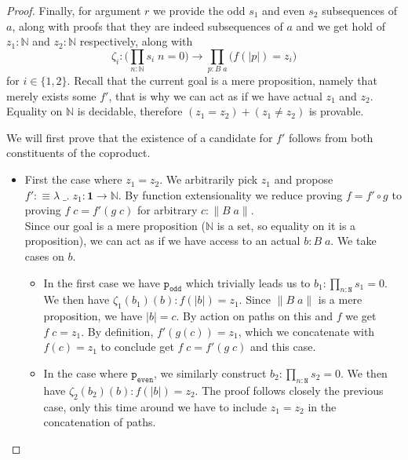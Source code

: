 \documentclass[12pt]{report}
\begin{document}
\begin{proof}
Finally, for argument $r$ we provide the odd $s_1$ and even $s_2$ subsequences of $a$, along with proofs that they are indeed subsequences of $a$ and we get hold of $z_1 : \mathbb{N}$ and $z_2 : \mathbb{N} $ respectively, along with 
$$\zeta_i : \big(\prod_{n : \mathbb{N}}s_i\; n = 0 \big)\rightarrow \prod_{p : B\; a}\big(f(|p|)=z_i\big)$$
for $i \in \{1,2\}$. 
Recall that the current goal is a mere proposition, namely that merely exists some $f'$, that is why we can act as if we have actual $z_1$ and $z_2$. 
Equality on $\mathbb{N}$ is decidable, therefore $(z_1 = z_2) + (z_1 \neq z_2)$ is provable. 

We will first prove that the existence of a candidate for $f'$ follows from both constituents of the coproduct.
\begin{itemize}
\item First the case where $z_1= z_2$. 
We arbitrarily pick $z_1$ and propose $f' : \equiv \lambda \;\_.\; z_1 : \mathbf{1} \rightarrow \mathbb{N}$. 
By function extensionality we reduce proving $f= f' \circ g$ to proving $f\; c = f'(g\; c)$ for arbitrary $c : \lVert B\; a\rVert$.\\
Since our goal is a mere proposition ($\mathbb{N}$ is a set, so equality on it is a proposition), we can act as if we have access to an actual $b : B\; a$. 
We take cases on $b$. 
\begin{itemize}
\item In the first case we have $\mathtt{p_{odd}}$ which trivially leads us to $b_1 : \prod_{n : \mathtt{N}}s_1 = 0$. 
We then have $\zeta_1(b_1)(b) : f(|b|) = z_1$. 
Since $\lVert B\; a\rVert$ is a mere proposition, we have $|b| =c$. 
By action on paths on this and $f$ we get $f\; c= z_1$. 
By definition, $f'(g(c)) = z_1$, which we concatenate with $f(c) = z_1$ to conclude get $f\; c = f'(g\; c)$ and this case.
\item In the case where $\mathtt{p_{even}}$, we similarly construct $b_2 : \prod_{n : \mathtt{N}}s_2 = 0$. 
We then have $\zeta_2(b_2)(b) : f(|b|) = z_2$. 
The proof follows closely the previous case, only this time around we have to include $z_1=z_2$ in the concatenation of paths.

\end{itemize}


\end{itemize}
\end{proof}
\end{document}
